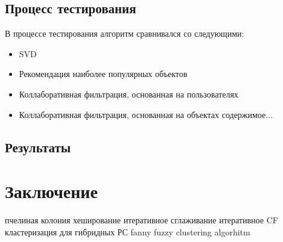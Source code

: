 \documentclass[12pt]{article} %
\begin{document}
\subsection{Процесс тестирования}
В процессе тестирования алгоритм сравнивался со следующими:
\begin{itemize}
\item SVD
\item Рекомендация наиболее популярных объектов
\item Коллаборативная фильтрация, основанная на пользователях
\item Коллаборативная фильтрация, основанная на объектах
содержимое...
\end{itemize}


\subsection{Результаты}

\section{Заключение}

\begin{thebibliography}{99}
 пчелиная колония
 хеширование
 итеративное сглаживание
 итеративное CF
 кластеризация для гибридных РС
 fanny fuzzy clustering algorhitm

\end{thebibliography}
\end{document}

